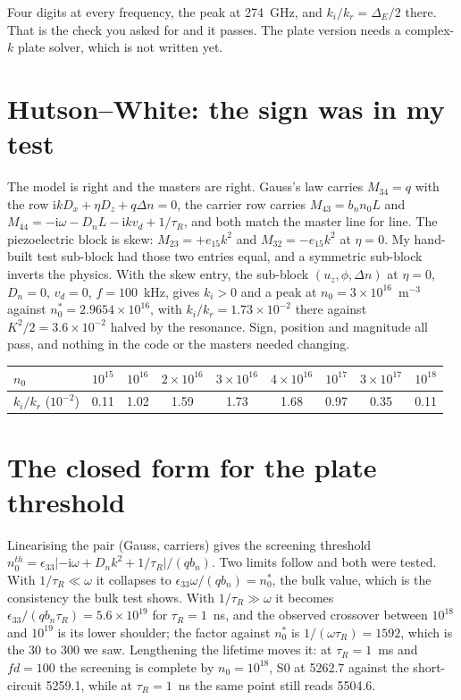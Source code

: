 \documentclass[11pt,a4paper]{article}
\begin{document}
Four digits at every frequency, the peak at 274~GHz, and $k_i/k_r=\Delta_E/2$ there. That is the
check you asked for and it passes. The plate version needs a complex-$k$ plate solver, which is not
written yet.

\section*{Hutson--White: the sign was in my test}

The model is right and the masters are right. Gauss's law carries $M_{34}=q$ with the row
$\mathrm{i}kD_x+\eta D_z+q\Delta n=0$, the carrier row carries $M_{43}=b_nn_0L$ and
$M_{44}=-\mathrm{i}\omega-D_nL-\mathrm{i}kv_d+1/\tau_R$, and both match the master line for line.
The piezoelectric block is skew: $M_{23}=+e_{15}k^{2}$ and $M_{32}=-e_{15}k^{2}$ at $\eta=0$. My
hand-built test sub-block had those two entries equal, and a symmetric sub-block inverts the
physics. With the skew entry, the sub-block $(u_z,\phi,\Delta n)$ at $\eta=0$, $D_n=0$, $v_d=0$,
$f=100$~kHz, gives $k_i>0$ and a peak at $n_0=3\times10^{16}$~m$^{-3}$ against
$n_0^{*}=2.9654\times10^{16}$, with $k_i/k_r=1.73\times10^{-2}$ there against $K^{2}/2=3.6\times10^{-2}$
halved by the resonance. Sign, position and magnitude all pass, and nothing in the code or the
masters needed changing.

\begin{center}\footnotesize
\begin{tabular}{lcccccccc}
\toprule
$n_0$ & $10^{15}$ & $10^{16}$ & $2\times10^{16}$ & $3\times10^{16}$ & $4\times10^{16}$ & $10^{17}$ & $3\times10^{17}$ & $10^{18}$\\
\midrule
$k_i/k_r$ ($10^{-2}$) & 0.11 & 1.02 & 1.59 & 1.73 & 1.68 & 0.97 & 0.35 & 0.11\\
\bottomrule
\end{tabular}
\end{center}

\section*{The closed form for the plate threshold}

Linearising the pair (Gauss, carriers) gives the screening threshold
$n_{0}^{th}=\epsilon_{33}\lvert -\mathrm{i}\omega+D_nk^{2}+1/\tau_R\rvert/(qb_n)$. Two limits follow
and both were tested. With $1/\tau_R\ll\omega$ it collapses to $\epsilon_{33}\omega/(qb_n)=n_0^{*}$,
the bulk value, which is the consistency the bulk test shows. With $1/\tau_R\gg\omega$ it becomes
$\epsilon_{33}/(qb_n\tau_R)=5.6\times10^{19}$ for $\tau_R=1$~ns, and the observed crossover between
$10^{18}$ and $10^{19}$ is its lower shoulder; the factor against $n_0^{*}$ is
$1/(\omega\tau_R)=1592$, which is the 30 to 300 we saw. Lengthening the lifetime moves it: at
$\tau_R=1$~ms and $fd=100$ the screening is complete by $n_0=10^{18}$, S0 at 5262.7 against the
short-circuit 5259.1, while at $\tau_R=1$~ns the same point still reads 5504.6.
\end{document}
